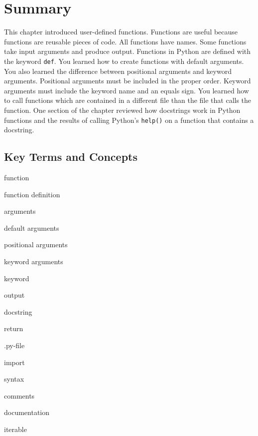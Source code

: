 \documentclass{book}
\newenvironment{key_terms}{\begin{multicols}{3}}{\end{multicols}} %
\newcommand{\passthrough}[1]{#1}
\begin{document}
    
        \newpage
        \hypertarget{summary}{%
\section{Summary}\label{summary}}

    




    
        This chapter introduced user-defined functions. Functions are useful
because functions are reusable pieces of code. All functions have names.
Some functions take input arguments and produce output. Functions in
Python are defined with the keyword \passthrough{\lstinline!def!}. You
learned how to create functions with default arguments. You also learned
the difference between positional arguments and keyword arguments.
Positional arguments must be included in the proper order. Keyword
arguments must include the keyword name and an equals sign. You learned
how to call functions which are contained in a different file than the
file that calls the function. One section of the chapter reviewed how
docstrings work in Python functions and the results of calling Python's
\passthrough{\lstinline!help()!} on a function that contains a
docstring.
    




    
        \hypertarget{key-terms-and-concepts}{%
\subsection{Key Terms and Concepts}\label{key-terms-and-concepts}}
    




    
        \begin{key_terms}
        function

function definition

arguments

default arguments

positional arguments

keyword arguments

keyword

output

docstring

return

.py-file

import

syntax

comments

documentation

iterable
        \end{key_terms}
\end{document}
